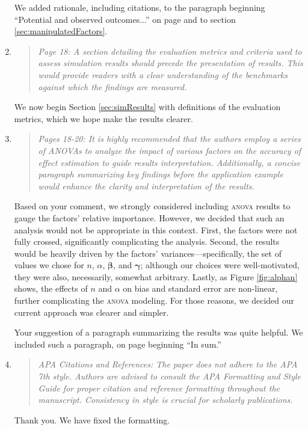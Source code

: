 \documentclass[]{article}
\newenvironment{itquote}
  {\begin{quote} \itshape}
  {\end{quote}\ignorespacesafterend}
\begin{document}
\begin{enumerate}
\begin{itquote}
\end{itquote}
We added rationale, including citations, to the paragraph beginning ``Potential and observed outcomes...'' on page \pageref{potential} and to section \ref{sec:manipulatedFactors}.

\item \begin{itquote}     Page 18: A section detailing the evaluation metrics and criteria used to assess simulation results should precede the presentation of results. This would provide readers with a clear understanding of the benchmarks against which the findings are measured.

\end{itquote}
We now begin Section \ref{sec:simResults} with definitions of the evaluation metrics, which we hope make the results clearer.

\item \begin{itquote}     Pages 18-20: It is highly recommended that the authors employ a series of ANOVAs to analyze the impact of various factors on the accuracy of effect estimation to guide results interpretation. Additionally, a concise paragraph summarizing key findings before the application example would enhance the clarity and interpretation of the results.
\end{itquote}
Based on your comment, we strongly considered including \textsc{anova} results to gauge the factors' relative importance. However, we decided that such an analysis would not be appropriate in this context. First, the factors were not fully crossed, significantly complicating the analysis. Second, the results would be heavily driven by the factors' variances---specifically, the set of values we chose for $n$, $\alpha$, $\bm\beta$, and $\bm\gamma$; although our choices were well-motivated, they were also, necessarily, somewhat arbitrary. 
Lastly, as Figure \ref{fig:alphan} shows, the effects of $n$ and $\alpha$ on bias and standard error are non-linear, further complicating the \textsc{anova} modeling. For those reasons, we decided our current approach was clearer and simpler.

Your suggestion of a paragraph summarizing the results was quite helpful. We included such a paragraph, on page \pageref{simsum} beginning ``In sum.''

\item \begin{itquote}      APA Citations and References: The paper does not adhere to the APA 7th style. Authors are advised to consult the APA Formatting and Style Guide for proper citation and reference formatting throughout the manuscript. Consistency in style is crucial for scholarly publications.
\end{itquote}
Thank you. We have fixed the formatting.
\end{enumerate}
\end{document}
